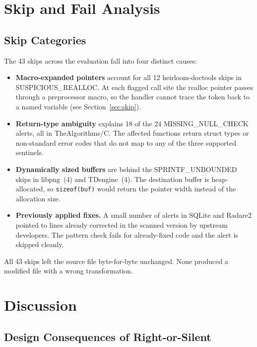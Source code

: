 \section{Skip and Fail Analysis}
\label{sec:skip_fail}

\subsection{Skip Categories}

The 43 skips across the evaluation fall into four distinct causes:

\begin{itemize}
  \item \textbf{Macro-expanded pointers} account for all 12 heirloom-doctools skips in SUSPICIOUS\_\allowbreak REALLOC. At each flagged call site the realloc pointer passes through a preprocessor macro, so the handler cannot trace the token back to a named variable (see Section~\ref{sec:skip}).

  \item \textbf{Return-type ambiguity} explains 18 of the 24 MISSING\_NULL\_CHECK alerts, all in TheAlgorithms/C. The affected functions return struct types or non-standard error codes that do not map to any of the three supported sentinels.

  \item \textbf{Dynamically sized buffers} are behind the SPRINTF\_UNBOUNDED skips in libpng~(4) and TDengine~(4). The destination buffer is heap-allocated, so \texttt{sizeof}\allowbreak\texttt{(buf)} would return the pointer width instead of the allocation size.

  \item \textbf{Previously applied fixes.} A small number of alerts in SQLite and Radare2 pointed to lines already corrected in the scanned version by upstream developers. The pattern check fails for already-fixed code and the alert is skipped cleanly.
\end{itemize}

All 43 skips left the source file byte-for-byte unchanged. None produced a modified file with a wrong transformation.

\section{Discussion}

\subsection{Design Consequences of Right-or-Silent}

